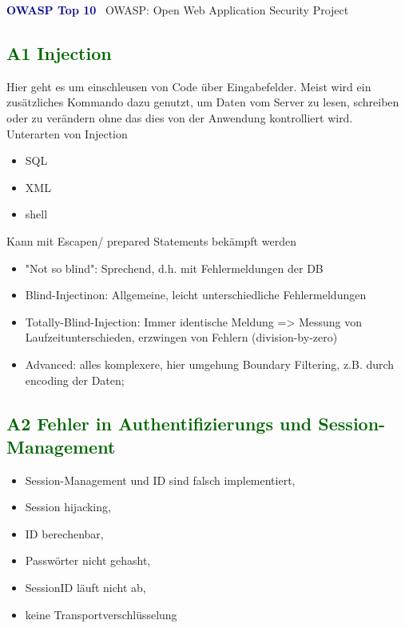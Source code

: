 \textbf{\textcolor{darkblue}{ OWASP Top 10}}~
OWASP: Open Web Application Security Project
\subsection*{\textcolor{darkgreen}{A1 Injection}}

Hier geht es um einschleusen von Code über Eingabefelder. Meist wird ein zusätzliches Kommando
dazu genutzt, um Daten vom Server zu lesen, schreiben oder zu verändern ohne das dies von
der Anwendung kontrolliert wird.
Unterarten von Injection
	\begin{itemize}
	\item SQL
	\item XML
	\item shell
	\end{itemize}
Kann mit Escapen/ prepared Statements bekämpft werden


\begin{itemize}
\item "Not so blind": Sprechend, d.h. mit Fehlermeldungen der DB
\item Blind-Injectinon: Allgemeine, leicht unterschiedliche Fehlermeldungen
\item Totally-Blind-Injection: Immer identische Meldung => Messung von Laufzeitunterschieden, erzwingen von Fehlern (division-by-zero)

\item Advanced: alles komplexere, hier umgehung Boundary Filtering, z.B. durch encoding der Daten;
\end{itemize}



\subsection*{\textcolor{darkgreen}{A2 Fehler in Authentifizierungs und Session-Management}}

	\begin{itemize}
	\item Session-Management und ID sind falsch implementiert,
	\item Session hijacking,
	\item ID berechenbar,
	\item Passwörter nicht gehasht,
	\item SessionID läuft nicht ab,
	\item keine Transportverschlüsselung
	\end{itemize}

